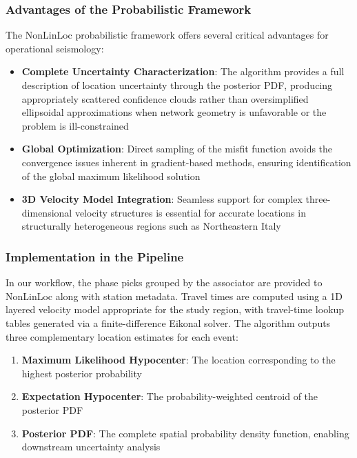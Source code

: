 \subsubsection{Advantages of the Probabilistic Framework}
The NonLinLoc probabilistic framework offers several critical advantages for
operational seismology:
\begin{itemize}
  \item \textbf{Complete Uncertainty Characterization}: The algorithm
    provides a full description of location uncertainty through the posterior
    PDF, producing appropriately scattered confidence clouds rather than
    oversimplified ellipsoidal approximations when network geometry is
    unfavorable or the problem is ill-constrained

  \item \textbf{Global Optimization}: Direct sampling of the misfit function
    avoids the convergence issues inherent in gradient-based methods, ensuring
    identification of the global maximum likelihood solution

  \item \textbf{3D Velocity Model Integration}: Seamless support for complex
    three-dimensional velocity structures is essential for accurate locations
    in structurally heterogeneous regions such as Northeastern Italy
\end{itemize}

\subsubsection{Implementation in the Pipeline}
In our workflow, the phase picks grouped by the associator are provided to
NonLinLoc along with station metadata. Travel times are computed using a 1D
layered velocity model appropriate for the study region, with travel-time
lookup tables generated via a finite-difference Eikonal solver. The algorithm
outputs three complementary location estimates for each event:
\begin{enumerate}
  \item \textbf{Maximum Likelihood Hypocenter}: The location corresponding to
    the highest posterior probability
  \item \textbf{Expectation Hypocenter}: The probability-weighted centroid of
    the posterior PDF
  \item \textbf{Posterior PDF}: The complete spatial probability density
    function, enabling downstream uncertainty analysis
\end{enumerate}


